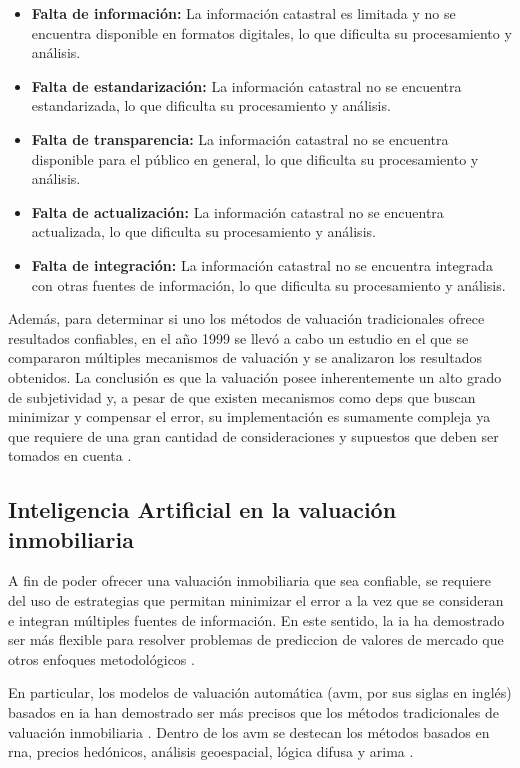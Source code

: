 \begin{itemize}
  \item \textbf{Falta de información:} La información catastral es limitada y
  no se encuentra disponible en formatos digitales, lo que dificulta su
  procesamiento y análisis.
  \item \textbf{Falta de estandarización:} La información catastral no se
  encuentra estandarizada, lo que dificulta su procesamiento y análisis.
  \item \textbf{Falta de transparencia:} La información catastral no se
  encuentra disponible para el público en general, lo que dificulta su
  procesamiento y análisis.
  \item \textbf{Falta de actualización:} La información catastral no se
  encuentra actualizada, lo que dificulta su procesamiento y análisis.
  \item \textbf{Falta de integración:} La información catastral no se
  encuentra integrada con otras fuentes de información, lo que dificulta su
  procesamiento y análisis.
\end{itemize}

Además, para determinar si uno los métodos de valuación tradicionales ofrece resultados
confiables, en el año 1999 se llevó a cabo un estudio en el que se compararon
múltiples mecanismos de valuación y se analizaron los resultados obtenidos. La
conclusión es que la valuación posee inherentemente un alto grado de subjetividad
y, a pesar de que existen mecanismos como \acrfull{deps} que buscan minimizar y
compensar el error, su implementación es sumamente compleja ya que requiere de
una gran cantidad de consideraciones y supuestos que deben ser tomados en cuenta
\cite{Shiller:1999aa}.

\subsection{Inteligencia Artificial en la valuación inmobiliaria}
A fin de poder ofrecer una valuación inmobiliaria que sea confiable, se requiere
del uso de estrategias que permitan minimizar el error a la vez que se consideran
e integran múltiples fuentes de información. En este sentido, la \acrfull{ia}
ha demostrado ser más flexible para resolver problemas de prediccion de valores
de mercado que otros enfoques metodológicos \cite{eguino2020catastro}.

En particular, los modelos de valuación automática (\acrfull{avm}, por sus siglas en inglés) basados en \acrshort{ia}
han demostrado ser más precisos que los métodos tradicionales de valuación
inmobiliaria \cite{eguino2020catastro}. Dentro de los \acrshort{avm}
se destecan los métodos basados en \acrfull{rna}, precios hedónicos, análisis
geoespacial, lógica difusa y \acrfull{arima} \cite{pagourtzi2003}.

